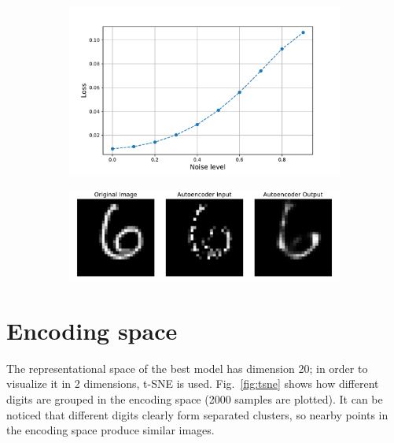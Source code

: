\documentclass[a4paper,11pt]{article}
\begin{document}
\begin{figure}[htp]
  \centering
  \caption{MSE loss as function of the occlusion level and example of the autoencoder reconstruction.}
  \label{fig:occlusion}
  \begin{subfigure}[c]{.45\linewidth}
    \includegraphics[width=\linewidth]{../occlusion/loss.pdf}
  \end{subfigure}
  \begin{subfigure}[c]{.45\linewidth}
    \includegraphics[width=\linewidth]{../occlusion/05.pdf}
  \end{subfigure}
\end{figure}

\section{Encoding space}
The representational space of the best model has dimension 20; in order to visualize it in 2 dimensions, t-SNE is used. Fig.~\ref{fig:tsne} shows how different digits are grouped in the encoding space (2000 samples are plotted). It can be noticed that different digits clearly form separated clusters, so nearby points in the encoding space produce similar images.
\end{document}
